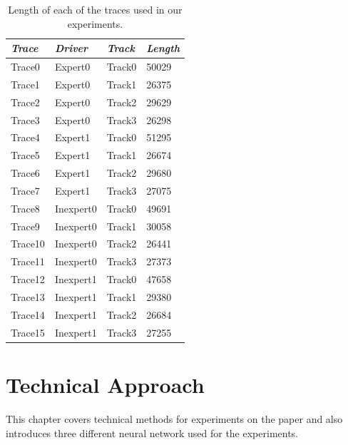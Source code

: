 \documentclass[draft,dvipsnames]{drexel-thesis}
\begin{document}
\begin{thesis}
\begin{table}[!t]
\centering
\caption{Length of each of the traces used in our experiments.}
\label{tbl:traces}
\begin{tabular}{|l|l|l|l|}
\hline
{\em Trace}   & {\em Driver}    & {\em Track}  & {\em Length} \\ \hline
Trace0  & Expert0   & Track0 & 50029  \\
Trace1  & Expert0   & Track1 & 26375  \\
Trace2  & Expert0   & Track2 & 29629  \\
Trace3  & Expert0   & Track3 & 26298  \\
Trace4  & Expert1   & Track0 & 51295  \\
Trace5  & Expert1   & Track1 & 26674  \\
Trace6  & Expert1   & Track2 & 29680  \\
Trace7  & Expert1   & Track3 & 27075  \\
Trace8  & Inexpert0 & Track0 & 49691  \\
Trace9  & Inexpert0 & Track1 & 30058  \\
Trace10 & Inexpert0 & Track2 & 26441  \\
Trace11 & Inexpert0 & Track3 & 27373  \\
Trace12 & Inexpert1 & Track0 & 47658  \\
Trace13 & Inexpert1 & Track1 & 29380  \\
Trace14 & Inexpert1 & Track2 & 26684  \\
Trace15 & Inexpert1 & Track3 & 27255  \\ \hline
\end{tabular}
\end{table}


\chapter{Technical Approach}

This chapter covers technical methods for experiments on the paper and also introduces three different neural network used for the experiments.



\end{thesis}
\end{document}
